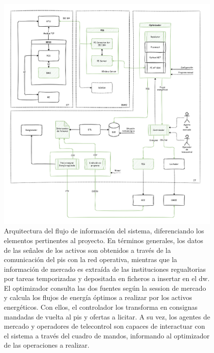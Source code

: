 \begin{figure}
  \centering
  \includegraphics[width=0.9\linewidth]{figures/arquitectura.png}
  \caption[Arquitectura del sistema.]{Arquitectura del flujo de información del sistema, diferenciando los elementos pertinentes al proyecto. En términos generales, los datos de las señales de los activos son obtenidos a través de la comunicación del \gls{pis} con la red operativa, mientras que la información de mercado es extraída de las instituciones regualtorias por tareas temporizadas y depositada en ficheros a insertar en el \gls{dw}. El optimizador consulta las dos fuentes según la session de mercado y calcula los flujos de energía óptimos a realizar por los activos energéticos. Con ellos, el controlador los transforma en consignas mandadas de vuelta al \gls{pis} y ofertas a licitar. A su vez, los agentes de mercado y operadores de telecontrol son capaces de interactuar con el sistema a través del cuadro de mandos, informando al optimizador de las operaciones a realizar.}%
  \label{fig:arquitectura}
\end{figure}

